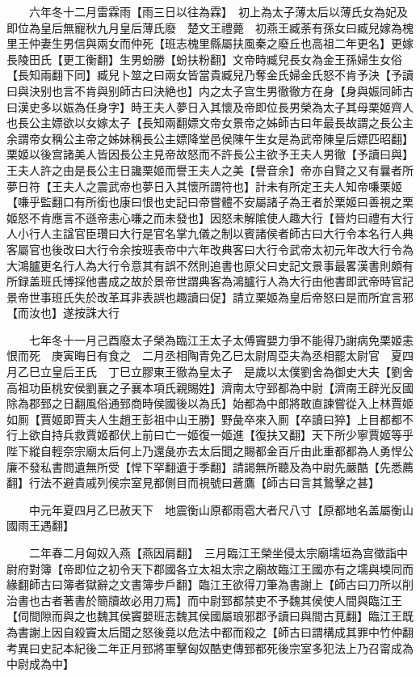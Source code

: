 　　六年冬十二月雷霖雨【雨三日以往為霖】　初上為太子薄太后以薄氏女為妃及即位為皇后無寵秋九月皇后薄氏廢　楚文王禮薨　初燕王臧荼有孫女曰臧兒嫁為槐里王仲妻生男信與兩女而仲死【班志槐里縣屬扶風秦之廢丘也高祖二年更名】更嫁長陵田氏【更工衡翻】生男蚡勝【蚡扶粉翻】文帝時臧兒長女為金王孫婦生女俗【長知兩翻下同】臧兒卜筮之曰兩女皆當貴臧兒乃奪金氏婦金氏怒不肯予決【予讀曰與決别也言不肯與别師古曰決絶也】内之太子宫生男徹徹方在身【身與娠同師古曰漢史多以娠為任身字】時王夫人夢日入其懷及帝即位長男榮為太子其母栗姬齊人也長公主嫖欲以女嫁太子【長知兩翻嫖文帝女景帝之姊師古曰年最長故謂之長公主余謂帝女稱公主帝之姊妹稱長公主嫖降堂邑侯陳午生女是為武帝陳皇后嫖匹昭翻】栗姬以後宫諸美人皆因長公主見帝故怒而不許長公主欲予王夫人男徹【予讀曰與】王夫人許之由是長公主日讒栗姬而譽王夫人之美【譽音余】帝亦自賢之又有曩者所夢日符【王夫人之震武帝也夢日入其懷所謂符也】計未有所定王夫人知帝嗛栗姬【嗛乎監翻口有所銜也康曰恨也史記曰帝嘗體不安屬諸子為王者於栗姬曰善視之栗姬怒不肯應言不遜帝恚心嗛之而未發也】因怒未解隂使人趣大行【晉灼曰禮有大行人小行人主諡官臣瓚曰大行是官名掌九儀之制以賓諸侯者師古曰大行令本名行人典客屬官也後改曰大行令余按班表帝中六年改典客曰大行令武帝太初元年改大行令為大鴻臚更名行人為大行令意其有誤不然則追書也原父曰史記文景事最畧漢書則頗有所録盖班氏博採他書成之故於景帝世謂典客為鴻臚行人為大行由他書即武帝時官記景帝世事班氏失於改革耳非表誤也趣讀曰促】請立栗姬為皇后帝怒曰是而所宜言邪【而汝也】遂按誅大行

　　七年冬十一月己酉廢太子榮為臨江王太子太傅竇嬰力爭不能得乃謝病免栗姬恚恨而死　庚寅晦日有食之　二月丞相陶青免乙巳太尉周亞夫為丞相罷太尉官　夏四月乙巳立皇后王氏　丁巳立膠東王徹為皇太子　是歲以太僕劉舍為御史大夫【劉舍高祖功臣桃安侯劉襄之子襄本項氏親賜姓】濟南太守郅都為中尉【濟南王辟光反國除為郡郅之日翻風俗通郅商時侯國後以為氏】始都為中郎將敢直諫嘗從入上林賈姬如厠【賈姬即賈夫人生趙王彭祖中山王勝】野彘卒來入厠【卒讀曰猝】上目都都不行上欲自持兵救賈姬都伏上前曰亡一姬復一姬進【復扶又翻】天下所少寧賈姬等乎陛下縱自輕奈宗廟太后何上乃還彘亦去太后聞之賜都金百斤由此重都都為人勇悍公廉不發私書問遺無所受【悍下罕翻遺于季翻】請謁無所聽及為中尉先嚴酷【先悉薦翻】行法不避貴戚列侯宗室見都側目而視號曰蒼鷹【師古曰言其鷙擊之甚】

　　中元年夏四月乙巳赦天下　地震衡山原都雨雹大者尺八寸【原都地名盖屬衡山國雨王遇翻】

　　二年春二月匈奴入燕【燕因肩翻】　三月臨江王榮坐侵太宗廟壖垣為宫徵詣中尉府對簿【帝即位之初令天下郡國各立太祖太宗之廟故臨江王國亦有之壖與堧同而緣翻師古曰簿者獄辭之文書簿步戶翻】臨江王欲得刀筆為書謝上【師古曰刀所以削治書也古者著書於簡牘故必用刀焉】而中尉郅都禁吏不予魏其侯使人間與臨江王【伺間隙而與之也魏其侯竇嬰班志魏其侯國屬琅邪郡予讀曰與間古莧翻】臨江王既為書謝上因自殺竇太后聞之怒後竟以危法中都而殺之【師古曰謂構成其罪中竹仲翻考異曰史記本紀後二年正月郅將軍擊匈奴酷吏傳郅都死後宗室多犯法上乃召甯成為中尉成為中】

